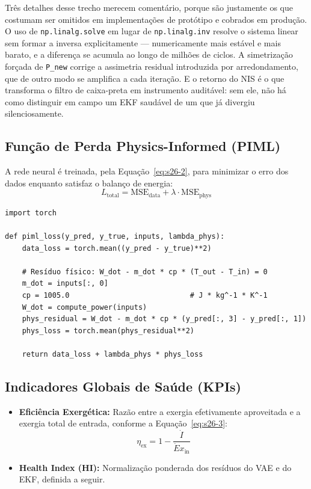 \documentclass[12pt,a4paper]{article}
\numberwithin{equation}{section}
\numberwithin{table}{section}
\numberwithin{figure}{section}
\begin{document}
{	Três detalhes desse trecho merecem comentário, porque são justamente os que costumam ser omitidos em implementações de protótipo e cobrados em produção. O uso de \texttt{np.linalg.solve} em lugar de \texttt{np.linalg.inv} resolve o sistema linear sem formar a inversa explicitamente — numericamente mais estável e mais barato, e a diferença se acumula ao longo de milhões de ciclos. A simetrização forçada de \texttt{P\_new} corrige a assimetria residual introduzida por arredondamento, que de outro modo se amplifica a cada iteração. E o retorno do NIS é o que transforma o filtro de caixa-preta em instrumento auditável: sem ele, não há como distinguir em campo um EKF saudável de um que já divergiu silenciosamente.
	
	\subsection{Função de Perda Physics-Informed (PIML)}
	A rede neural é treinada, pela Equação~\eqref{eq:s26-2}, para minimizar o erro dos dados enquanto satisfaz o balanço de energia:
	\begin{equation}\label{eq:s26-2}
 L_{\text{total}} = \text{MSE}_{\text{data}} + \lambda \cdotp \text{MSE}_{\text{phys}} 
\end{equation}
	\begin{verbatim}
import torch

def piml_loss(y_pred, y_true, inputs, lambda_phys):
    data_loss = torch.mean((y_pred - y_true)**2)

    # Resíduo físico: W_dot - m_dot * cp * (T_out - T_in) = 0
    m_dot = inputs[:, 0]
    cp = 1005.0                            # J * kg^-1 * K^-1
    W_dot = compute_power(inputs)
    phys_residual = W_dot - m_dot * cp * (y_pred[:, 3] - y_pred[:, 1])
    phys_loss = torch.mean(phys_residual**2)

    return data_loss + lambda_phys * phys_loss
\end{verbatim}
	
	\subsection{Indicadores Globais de Saúde (KPIs)}
	\begin{itemize}
		\item \textbf{Eficiência Exergética:} Razão entre a exergia efetivamente aproveitada e a exergia total de entrada, conforme a Equação~\eqref{eq:s26-3}:
		\begin{equation}\label{eq:s26-3}
 \eta_{\text{ex}} = 1 - \frac{\dot{I}}{\dot{E}x_{\text{in}}}
\end{equation}
		\item \textbf{Health Index (HI):} Normalização ponderada dos resíduos do VAE e do EKF, definida a seguir.
	\end{itemize}

}
\end{document}
